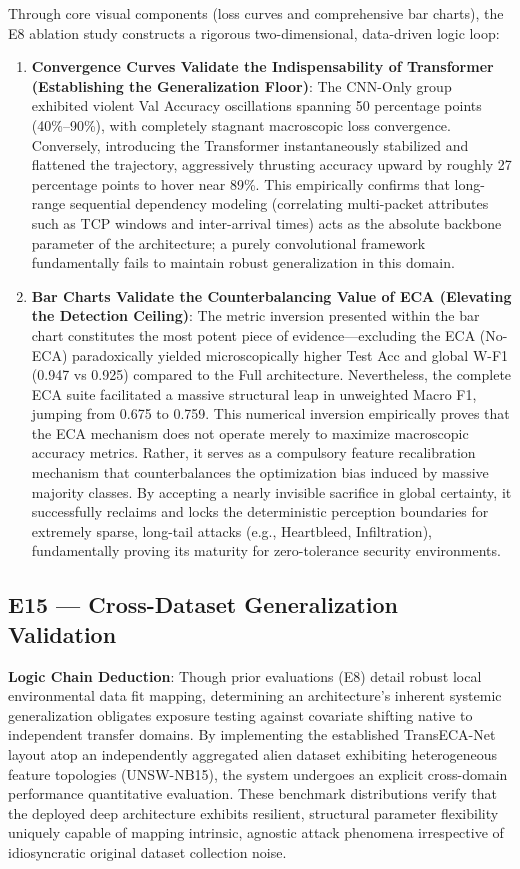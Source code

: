 \documentclass[sigconf]{acmart}
\begin{document}
Through core visual components (loss curves and comprehensive bar charts), the E8 ablation study constructs a rigorous two-dimensional, data-driven logic loop:
\begin{enumerate}
\item \textbf{Convergence Curves Validate the Indispensability of Transformer (Establishing the Generalization Floor)}: 
The CNN-Only group exhibited violent Val Accuracy oscillations spanning 50 percentage points (40\%--90\%), with completely stagnant macroscopic loss convergence. Conversely, introducing the Transformer instantaneously stabilized and flattened the trajectory, aggressively thrusting accuracy upward by roughly 27 percentage points to hover near 89\%. This empirically confirms that long-range sequential dependency modeling (correlating multi-packet attributes such as TCP windows and inter-arrival times) acts as the absolute backbone parameter of the architecture; a purely convolutional framework fundamentally fails to maintain robust generalization in this domain.
\item \textbf{Bar Charts Validate the Counterbalancing Value of ECA (Elevating the Detection Ceiling)}: 
The metric inversion presented within the bar chart constitutes the most potent piece of evidence---excluding the ECA (No-ECA) paradoxically yielded microscopically higher Test Acc and global W-F1 (0.947 vs 0.925) compared to the Full architecture. Nevertheless, the complete ECA suite facilitated a massive structural leap in unweighted Macro F1, jumping from 0.675 to 0.759. This numerical inversion empirically proves that the ECA mechanism does not operate merely to maximize macroscopic accuracy metrics. Rather, it serves as a compulsory feature recalibration mechanism that counterbalances the optimization bias induced by massive majority classes. By accepting a nearly invisible sacrifice in global certainty, it successfully reclaims and locks the deterministic perception boundaries for extremely sparse, long-tail attacks (e.g., Heartbleed, Infiltration), fundamentally proving its maturity for zero-tolerance security environments.
\end{enumerate}

\subsection{E15 --- Cross-Dataset Generalization Validation}
\textbf{Logic Chain Deduction}: Though prior evaluations (E8) detail robust local environmental data fit mapping, determining an architecture's inherent systemic generalization obligates exposure testing against covariate shifting native to independent transfer domains. By implementing the established TransECA-Net layout atop an independently aggregated alien dataset exhibiting heterogeneous feature topologies (UNSW-NB15), the system undergoes an explicit cross-domain performance quantitative evaluation. These benchmark distributions verify that the deployed deep architecture exhibits resilient, structural parameter flexibility uniquely capable of mapping intrinsic, agnostic attack phenomena irrespective of idiosyncratic original dataset collection noise.
\end{document}
